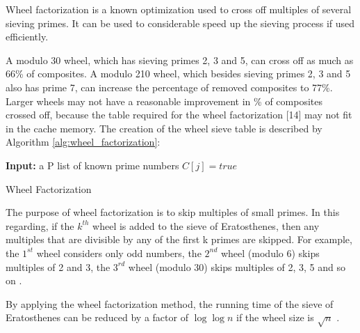 \documentclass[runningheads,a4paper]{llncs}
\begin{document}
Wheel factorization \cite{pritchard1982wheel} is a known optimization used to cross off multiples of several sieving primes. It can be used to considerable speed up the sieving process if used efficiently.

A modulo 30 wheel, which has sieving primes 2, 3 and 5, can cross off as much as 66\% of composites. 
A modulo 210 wheel, which besides sieving primes 2, 3 and 5 also has prime 7, can increase the percentage of removed composites to 77\%.
Larger wheels may not have a reasonable improvement in \% of composites crossed off, because the table required for the wheel factorization [14] may not fit in the cache memory. The creation of the wheel sieve table is described by Algorithm \ref{alg:wheel_factorization}:

\begin{algorithm}[h]
        \begin{algorithmic}[1]
                \State \textbf{Input:} a P list of known prime numbers
                \Statex
                                \State $C[j] = true$
                        \EndFor
                \EndFor
                \Statex
        \end{algorithmic}
        \caption{Wheel Factorization}
        \label{alg:wheel_factorization}
\end{algorithm}


The purpose of wheel factorization is to skip multiples of small primes. In this regarding, if the $k^{th}$ wheel is added to the sieve of Eratosthenes, then any multiples that are divisible by any of the first k primes are skipped. For example, the $1^{st}$ wheel considers only odd numbers, the $2^{nd}$ wheel (modulo 6) skips multiples of 2 and 3, the $3^{rd}$ wheel (modulo 30) skips multiples of 2, 3, 5 and so on \cite{kim2013}.

By applying the wheel factorization method, the running time of the sieve of Eratosthenes can be reduced by a factor of $\log{\log{n}}$ if the wheel size is $\sqrt{n}$ \cite{pritchard1983fast}.
\end{document}

